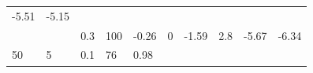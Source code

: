 \documentclass[12pt,oneside,a4paper]{reedthesis}
\begin{document}
\begin{longtable}[]{@{}llllllllll@{}}
\begin{minipage}[t]{0.09\columnwidth}
-5.51\strut
\end{minipage} & \begin{minipage}[t]{0.09\columnwidth}\raggedright
-5.15\strut
\end{minipage}\tabularnewline
\begin{minipage}[t]{0.11\columnwidth}\raggedright
\strut
\end{minipage} & \begin{minipage}[t]{0.05\columnwidth}\raggedright
\strut
\end{minipage} & \begin{minipage}[t]{0.05\columnwidth}\raggedright
0.3\strut
\end{minipage} & \begin{minipage}[t]{0.05\columnwidth}\raggedright
100\strut
\end{minipage} & \begin{minipage}[t]{0.07\columnwidth}\raggedright
-0.26\strut
\end{minipage} & \begin{minipage}[t]{0.07\columnwidth}\raggedright
0\strut
\end{minipage} & \begin{minipage}[t]{0.07\columnwidth}\raggedright
-1.59\strut
\end{minipage} & \begin{minipage}[t]{0.07\columnwidth}\raggedright
2.8\strut
\end{minipage} & \begin{minipage}[t]{0.09\columnwidth}\raggedright
-5.67\strut
\end{minipage} & \begin{minipage}[t]{0.09\columnwidth}\raggedright
-6.34\strut
\end{minipage}\tabularnewline
\begin{minipage}[t]{0.11\columnwidth}\raggedright
50\strut
\end{minipage} & \begin{minipage}[t]{0.05\columnwidth}\raggedright
5\strut
\end{minipage} & \begin{minipage}[t]{0.05\columnwidth}\raggedright
0.1\strut
\end{minipage} & \begin{minipage}[t]{0.05\columnwidth}\raggedright
76\strut
\end{minipage} & \begin{minipage}[t]{0.07\columnwidth}\raggedright
0.98\strut
\end{minipage} & \begin{minipage}[t]{0.07\columnwidth}\raggedright

\end{minipage}
\end{longtable}
\end{document}
